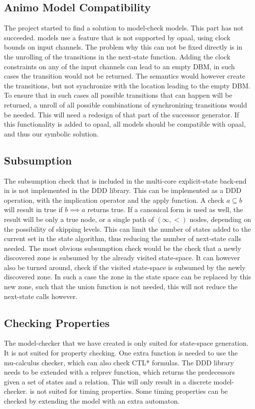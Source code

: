 \subsection{Animo Model Compatibility}
The project started to find a solution to model-check \animo{} models. This part has not succeeded. \animo{} models use a \uppaal{} feature that is not supported by opaal, using clock bounds on input channels. The problem why this can not be fixed directly is in the unrolling of the transitions in the next-state function. Adding the clock constraints on any of the input channels can lead to an empty DBM, in such cases the transition would not be returned. The semantics would however create the transitions, but not synchronize with the location leading to the empty DBM. To ensure that in such cases all possible transitions that can happen will be returned, a unroll of all possible combinations of synchronizing transitions would be needed. This will need a redesign of that part of the successor generator. If this functionality is added to opaal, all \animo{} models should be compatible with opaal, and thus our symbolic solution.

\subsection{Subsumption}
The subsumption check that is included in the multi-core explicit-state back-end in \ltsmin{} is not implemented in the DDD library. This can be implemented as a DDD operation, with the implication operator and the apply function. A check $a \subseteq b$ will result in true if $b \implies a$ returns true. If a canonical form is used as well, the result will be only a true node, or a single path of $(\infty,<)$ nodes, depending on the possibility of skipping levels. This can limit the number of states added to the current set in the state algorithm, thus reducing the number of next-state calls needed. The most obvious subsumption check would be the check that a newly discovered zone is subsumed by the already visited state-space. It can however also be turned around, check if the visited state-space is subsumed by the newly discovered zone. In such a case the zone in the state space can be replaced by this new zone, such that the union function is not needed, this will not reduce the next-state calls however.

\subsection{Checking Properties}
The model-checker that we have created is only suited for state-space generation. It is not suited for property checking. One extra function is needed to use the \ltsmin{} mu-calculus checker, which can also check CTL* formulas. The DDD library needs to be extended with a relprev function, which returns the predecessors given a set of states and a relation. This will only result in a discrete model-checker. \ltsmin{} is not suited for timing properties. Some timing properties can be checked by extending the model with an extra automaton.

